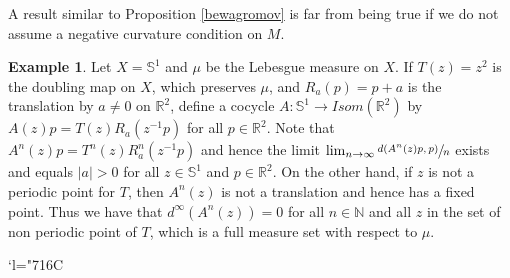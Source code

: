 \documentclass[JEP,XML,SOM,Unicode,NoEqCountersInSection]{cedram}
\newcommand{\Changelback}{\mathcode`l="716C}
\theoremstyle{plain}
\theoremstyle{definition}
\newtheorem{ej}[teo]{Example}
\newcommand{\NN}{\mathbb{N}}
\newcommand{\RR}{\mathbb{R}}
\newcommand{\Isom}{\mathit{Isom}}
\newcommand{\ccl}[3]{#1^{#2}(#3)}
\begin{document}
A result similar to Proposition \ref{bewagromov} is far from being true if we do not assume a negative curvature condition on $M$.
\begin{ej}Let $X=\mathbb{S}^1$ and $\mu$ be the Lebesgue measure on $X$. If $T(z)=z^{2}$ is the doubling map on $X$, which preserves $\mu$, and $R_{a}(p)=p+a$ is the translation by $a\neq 0$ on $\RR^{2}$, define a cocycle $A:\mathbb{S}^1 \rightarrow \Isom(\mathbb{R}^{2})$ by $A(z)p=T(z)R_{a}(z^{-1}p)$ for all $p\in \RR^2$. Note that $\ccl{A}{n}{z}p=T^{n}(z)R^{n}_{a}(z^{-1}p)$ and hence the limit
$\lim_{n \to \infty}{\sfrac{d(\ccl{A}{n}{z}p,p)}{n}}$ exists and equals $|a|>0$ for all $z\in \mathbb{S}^1$ and $p\in \RR^2$. On the other hand, if $z$ is not a periodic point for $T$, then $\ccl{A}{n}{z}$ is not a translation and hence has a fixed point. Thus we have that $d^{\infty}(\ccl{A}{n}{z})=0$ for all $n\in \NN$ and all $z$ in the set of non periodic point of $T$, which is a full measure set with respect to $\mu$.
\end{ej}

\Changelback
\backmatter


\end{document}
